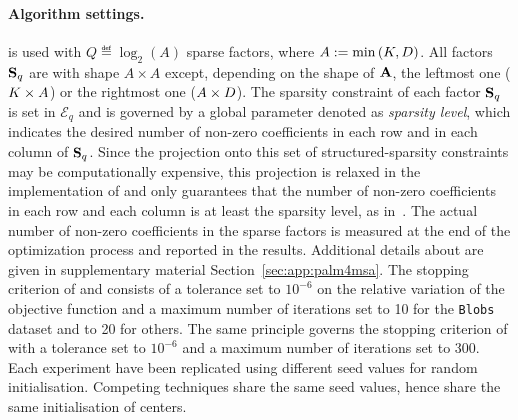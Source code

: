 \paragraph{Algorithm settings.} 
\qkmeans is used with $Q\eqdef\log_2\left (A\right )$ sparse factors, where  $A:=\min\left (K, D\right )$. 
All factors ${\mathbf{S}}_q$ are with shape $A \times A$ except, depending on the shape of ${\mathbf{A}}$, the leftmost one ($K\times A$) or the rightmost one ($A\times D$). 
The sparsity constraint of each factor ${\mathbf{S}}_q$ is set in $\mathcal{E}_q$ and is governed by a global parameter denoted as \textit{sparsity level}, which indicates the desired number of non-zero coefficients in each row and in each column of ${\mathbf{S}}_q$. 
Since the projection onto this set of structured-sparsity constraints may be computationally expensive, this projection is relaxed in the implementation of \palm and only guarantees that the number of non-zero coefficients in each row and each column is at least the sparsity level, as in~\cite{LeMagoarou2016Flexible}.
The actual number of non-zero coefficients in the sparse factors is measured at the end of the optimization process and reported in the results.
Additional details about \palm are given in supplementary material Section~\ref{sec:app:palm4msa}.
The stopping criterion of \kmeans and \qkmeans consists of a tolerance set to $10^{-6}$ on the relative variation of the objective function and a maximum number of iterations set to 10 for the \texttt{Blobs} dataset and to 20 for others. 
The same principle governs the stopping criterion of \palm with a tolerance set to $10^{-6}$ and a maximum number of iterations set to 300. Each experiment have been replicated using different seed values for random initialisation. 
Competing techniques share the same seed values, hence share the same initialisation of centers.

%

